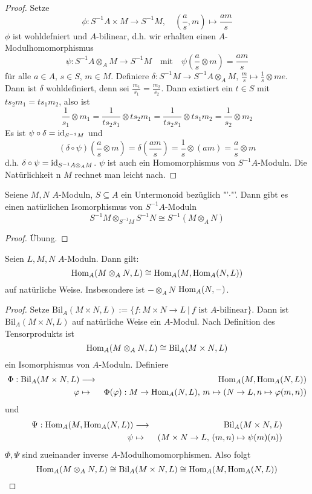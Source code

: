\begin{proof}
	Setze $$\phi:S^{-1}A \times M \to S^{-1} M, \quad  \left(\frac{a}{s}, m\right) \mapsto \frac{am}{s}$$
	$\phi$ ist wohldefniert und $A$-bilinear, d.h. wir erhalten einen $A$-Modulhomomorphismus
	$$\psi: S^{-1}A \otimes_A M \longrightarrow S^{-1} M \quad \text{mit} \quad \psi\left(\frac{a}{s} \otimes m \right) =\frac{am}{s}$$
	für alle $a\in A, \, s\in S,\, m \in M$. Definiere $\delta: S^{-1}M \to S^{-1}A \otimes_AM, \, \frac{m}{s} \mapsto \frac{1}{s} \otimes me $. Dann ist $\delta$ wohldefiniert, denn sei $\frac{m_1}{s_1} =\frac{m_2}{s_2}$. Dann existiert ein $t\in S$ mit $ts_2m_1 = ts_1m_2$, also ist 
	$$\frac{1}{s_1} \otimes m_1 = \frac{1}{ts_2s_1} \otimes ts_2 m_1 = \frac{1}{ts_2s_1} \otimes ts_1 m_2 = \frac{1}{s_2} \otimes m_2$$
	Es ist $\psi \circ \delta = \operatorname{id}_{S^{-1}M}$ und 
	$$(\delta\circ \psi)\left(\frac{a}{s} \otimes m\right)= \delta \left(\frac{am}{s}\right)= \frac{1}{s}\otimes (am) = \frac{a}{s}\otimes m$$
	d.h. $\delta \circ \psi = \operatorname{id}_{S^{-1}A \otimes_A M}$. $\psi$ ist auch ein Homomorphismus von $S^{-1}A$-Moduln. Die Natürlichkeit n $M$ rechnet man leicht nach.	
\end{proof}
\begin{bem}\label{13.12}
	Seiene $M,N$ $A$-Moduln, $S\subseteq A$ ein Untermonoid bezüglich "'$\cdot$"'. Dann gibt es einen natürlichen Isomorphismus von $S^{-1}A$-Moduln 
	$$S^{-1} M \otimes_{S^{-1}M} S^{-1}N \cong S^{-1} (M \otimes_A N)$$
\end{bem}
\begin{proof}
	Übung.
\end{proof}
\begin{bem}\label{13.13}
	Seien $L,M,N$ $A$-Moduln. Dann gilt: 
	$$\operatorname{Hom}_A(M \otimes_A N, L) \cong \operatorname{Hom}_A(M, \operatorname{Hom}_A(N,L))$$
	auf natürliche Weise. Insbesondere ist $-\otimes_AN$  $\operatorname{Hom}_A(N,-)$. 
\end{bem}
\begin{proof}
	Setze $\text{Bil}_A(M\times N,L):= \{f:M \times N \to L \ | \ f \text{ ist }A\text{-bilinear}\}$. Dann ist $\text{Bil}_A(M \times N,L)$ auf natürliche Weise ein $A$-Modul. Nach Definition des Tensorprodukts ist 
	$$\operatorname{Hom}_A(M \otimes_AN,L) \cong \text{Bil}_A(M \times N,L)$$
	ein Isomorphismus von $A$-Moduln. Definiere 
	\begin{eqnarray*}
		\Phi: \text{Bil}_A(M \times N, L) &\longrightarrow &\operatorname{Hom}_A(M, \operatorname{Hom}_A(N,L))\\
		 \varphi &\mapsto& \Phi(\varphi): M \to \operatorname{Hom}_A(N,L), \, m \mapsto (N \to L, n \mapsto \varphi(m,n))
 	\end{eqnarray*}
 	und 
 	\begin{eqnarray*}
 	\Psi: \operatorname{Hom}_A(M, \operatorname{Hom}_A(N,L)) & \longrightarrow & \text{Bil}_A(M \times N,L) \\
 	\psi &\mapsto& (M \times N \to L, \, (m,n) \mapsto \psi(m)(n) ) 
 	\end{eqnarray*}
 	$\Phi, \Psi$ sind zueinander inverse $A$-Modulhomomorphismen. Also folgt
 	$$\operatorname{Hom}_A(M \otimes_A N,L) \cong \text{Bil}_A(M \times N,L) \cong \operatorname{Hom}_A(M,\operatorname{Hom}_A(N,L))$$
\end{proof}
